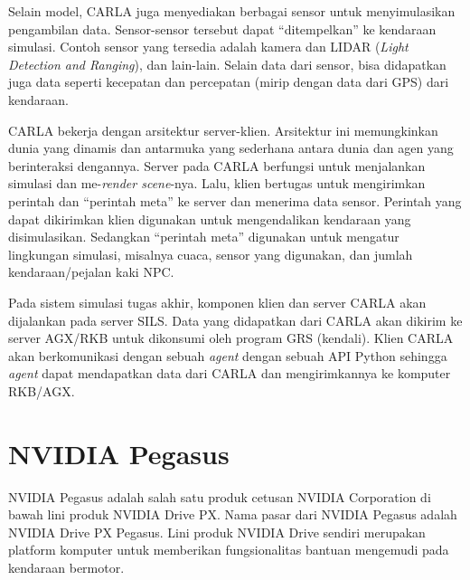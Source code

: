 Selain model, CARLA juga menyediakan berbagai sensor untuk menyimulasikan
pengambilan data. Sensor-sensor tersebut dapat ``ditempelkan'' ke kendaraan
simulasi. Contoh sensor yang tersedia adalah kamera dan LIDAR (\textit{Light
	Detection and Ranging}), dan lain-lain. Selain data dari sensor, bisa didapatkan
juga data seperti kecepatan dan percepatan (mirip dengan data dari GPS) dari
kendaraan.

CARLA bekerja dengan arsitektur server-klien. Arsitektur ini memungkinkan dunia
yang dinamis dan antarmuka yang sederhana antara dunia dan agen yang
berinteraksi dengannya. Server pada CARLA berfungsi untuk menjalankan simulasi
dan me-\textit{render scene}-nya. Lalu, klien bertugas untuk mengirimkan
perintah dan ``perintah meta'' ke server dan menerima data sensor. Perintah yang
dapat dikirimkan klien digunakan untuk mengendalikan kendaraan yang
disimulasikan. Sedangkan ``perintah meta'' digunakan untuk mengatur lingkungan
simulasi, misalnya cuaca, sensor yang digunakan, dan jumlah kendaraan/pejalan
kaki NPC.

Pada sistem simulasi tugas akhir, komponen klien dan server CARLA akan
dijalankan pada server SILS. Data yang didapatkan dari CARLA akan dikirim ke
server AGX/RKB untuk dikonsumi oleh program GRS (kendali). Klien CARLA akan
berkomunikasi dengan sebuah \textit{agent} dengan sebuah API Python sehingga
\textit{agent} dapat mendapatkan data dari CARLA dan mengirimkannya ke komputer
RKB/AGX.

\section{NVIDIA Pegasus}\label{chapter-2-section-pegasus}

NVIDIA Pegasus adalah salah satu produk cetusan NVIDIA Corporation di bawah lini
produk NVIDIA Drive PX. Nama pasar dari NVIDIA Pegasus adalah NVIDIA Drive
PX Pegasus. Lini produk NVIDIA Drive sendiri merupakan platform komputer untuk
memberikan fungsionalitas bantuan mengemudi pada kendaraan bermotor.

